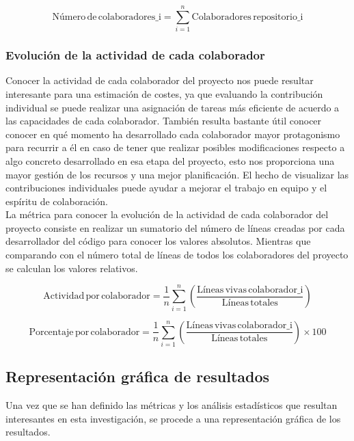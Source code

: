 \documentclass[a4paper, 12pt]{book}
\begin{document}
\[\text{Número} \, \text{de} \, \text{colaboradores_i} = \sum_{i=1}^{n} \text{Colaboradores} \, \text{repositorio_i}\]

\subsubsection{Evolución de la actividad de cada colaborador}
\label{subsubsec:actividad-desarrollador}

Conocer la actividad de cada colaborador del proyecto nos puede resultar interesante para una estimación de costes, ya que evaluando la contribución
individual se puede realizar una asignación de tareas más eficiente de acuerdo a las capacidades de cada colaborador. También resulta bastante útil conocer
conocer en qué momento ha desarrollado cada colaborador mayor protagonismo para recurrir a él en caso de tener que realizar posibles modificaciones respecto
a algo concreto desarrollado en esa etapa del proyecto, esto nos proporciona una mayor gestión de los recursos y una mejor planificación.
El hecho de visualizar las contribuciones individuales puede ayudar a mejorar el trabajo en equipo y el espíritu de colaboración.
\\La métrica para conocer la evolución de la actividad de cada colaborador del proyecto consiste en realizar un sumatorio del número de líneas
creadas por cada desarrollador del código para conocer los valores absolutos. Mientras que comparando con el número total de líneas de todos los colaboradores
del proyecto se calculan los valores relativos.

\[\text{Actividad} \, \text{por} \, \text{colaborador} = \frac{1}{n} \sum_{i=1}^{n} \left( \frac{\text{Líneas} \, \text{vivas} \, \text{colaborador_i}}{\text{Líneas} \, \text{totales}} \right)\]

\[\text{Porcentaje} \, \text{por} \, \text{colaborador} = \frac{1}{n} \sum_{i=1}^{n} \left( \frac{\text{Líneas} \, \text{vivas} \, \text{colaborador_i}}{\text{Líneas} \, \text{totales}} \right) \times 100\]

\subsection{Representación gráfica de resultados}
\label{subsec:graficos}

Una vez que se han definido las métricas y los análisis estadísticos que resultan interesantes en esta investigación, se procede a una representación gráfica
de los resultados.
\end{document}
